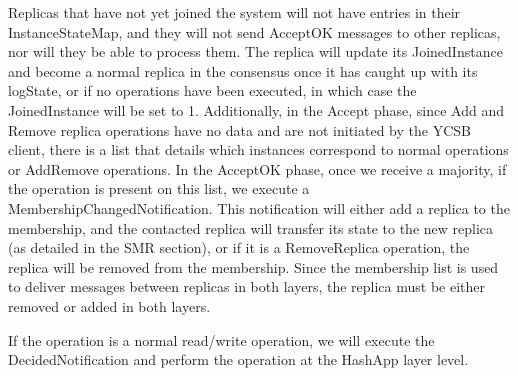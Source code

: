 \documentclass[sigconf]{acmart}
\begin{document}
Replicas that have not yet joined the system will not have entries in their InstanceStateMap, and they will not send AcceptOK messages to other replicas, nor will they be able to process them. The replica will update its JoinedInstance and become a normal replica in the consensus once it has caught up with its logState, or if no operations have been executed, in which case the JoinedInstance will be set to 1.
Additionally, in the Accept phase, since Add and Remove replica operations have no data and are not initiated by the YCSB client, there is a list that details which instances correspond to normal operations or AddRemove operations. In the AcceptOK phase, once we receive a majority, if the operation is present on this list, we execute a MembershipChangedNotification. This notification will either add a replica to the membership, and the contacted replica will transfer its state to the new replica (as detailed in the SMR section), or if it is a RemoveReplica operation, the replica will be removed from the membership. Since the membership list is used to deliver messages between replicas in both layers, the replica must be either removed or added in both layers.

If the operation is a normal read/write operation, we will execute the DecidedNotification and perform the operation at the HashApp layer level.
\end{document}
